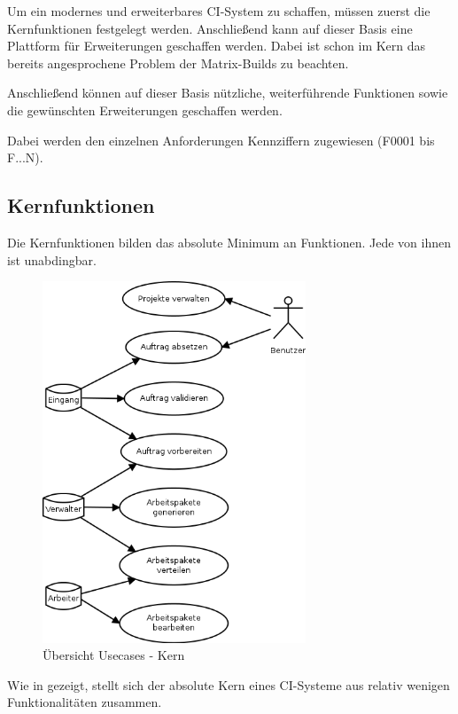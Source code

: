 Um ein modernes und erweiterbares \ac{CI}-System zu schaffen,
müssen zuerst die Kernfunktionen festgelegt werden.
Anschließend kann auf dieser Basis
eine Plattform für Erweiterungen geschaffen werden.
Dabei ist schon im Kern das bereits angesprochene Problem
der Matrix-Builds zu beachten.

Anschließend können auf dieser Basis nützliche, weiterführende Funktionen
sowie die gewünschten Erweiterungen geschaffen werden.

Dabei werden den einzelnen Anforderungen Kennziffern zugewiesen (F0001 bis F...N).

\subsection{Kernfunktionen}

Die Kernfunktionen bilden das absolute Minimum an Funktionen.
Jede von ihnen ist unabdingbar.

\begin{figure}
  \centering
  \includegraphics[width=0.7\textwidth]{imageinput/use-case-muss.png}
  \caption{\"Ubersicht Usecases - Kern}
  \label{fig:use-case-muss}
\end{figure}

Wie in  gezeigt,
stellt sich der absolute Kern eines CI-Systeme aus relativ wenigen Funktionalitäten zusammen.

